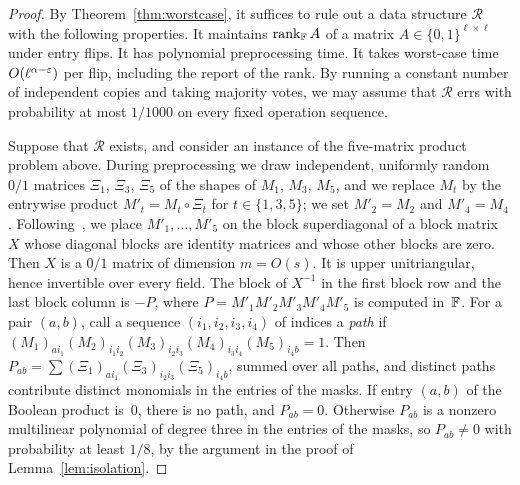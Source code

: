\begin{proof}
By Theorem~\ref{thm:worstcase}, it suffices to rule out a data structure $\mathcal{R}$ with the following properties.
It maintains $\operatorname{rank}_{\mathbb{F}}A$ of a matrix $A\in\{0,1\}^{\ell\times\ell}$ under entry flips.
It has polynomial preprocessing time.
It takes worst-case time $O(\ell^{\alpha-\varepsilon})$ per flip, including the report of the rank.
By running a constant number of independent copies and taking majority votes, we may assume that $\mathcal{R}$ errs with probability at most $1/1000$ on every fixed operation sequence.

Suppose that $\mathcal{R}$ exists, and consider an instance of the five-matrix product problem above.
During preprocessing we draw independent, uniformly random $0/1$ matrices $\Xi_1$, $\Xi_3$, $\Xi_5$ of the shapes of $M_1$, $M_3$, $M_5$, and we replace $M_t$ by the entrywise product $M'_t=M_t\circ\Xi_t$ for $t\in\{1,3,5\}$; we set $M'_2=M_2$ and $M'_4=M_4$.
Following~\cite[Theorem~C.1]{vdBNS19full}, we place $M'_1,\dots,M'_5$ on the block superdiagonal of a block matrix $X$ whose diagonal blocks are identity matrices and whose other blocks are zero.
Then $X$ is a $0/1$ matrix of dimension $m=O(s)$.
It is upper unitriangular, hence invertible over every field.
The block of $X^{-1}$ in the first block row and the last block column is $-P$, where $P=M'_1M'_2M'_3M'_4M'_5$ is computed in~$\mathbb{F}$.
For a pair $(a,b)$, call a sequence $(i_1,i_2,i_3,i_4)$ of indices a \emph{path} if $(M_1)_{ai_1}(M_2)_{i_1i_2}(M_3)_{i_2i_3}(M_4)_{i_3i_4}(M_5)_{i_4b}=1$.
Then $P_{ab}=\sum(\Xi_1)_{ai_1}(\Xi_3)_{i_2i_3}(\Xi_5)_{i_4b}$, summed over all paths, and distinct paths contribute distinct monomials in the entries of the masks.
If entry $(a,b)$ of the Boolean product is~$0$, there is no path, and $P_{ab}=0$.
Otherwise $P_{ab}$ is a nonzero multilinear polynomial of degree three in the entries of the masks, so $P_{ab}\ne0$ with probability at least $1/8$, by the argument in the proof of Lemma~\ref{lem:isolation}.


\end{proof}
